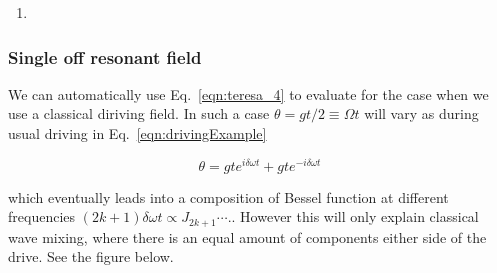 \begin{enumerate}
		\item {}
	\end{enumerate}

	\subsubsection{Single off resonant field}
	 We can automatically use Eq.~\eqref{eqn:teresa_4} to evaluate  for the case when we use a classical diriving field. In such a case $ \theta = gt/2 \equiv \Omega t$ will vary as during usual driving in Eq.~\eqref{eqn:drivingExample}
	 
	 \begin{equation}\label{key}
	 	\theta = gt e^{i\delta\omega t} + gte^{-i\delta\omega t}
	 \end{equation}
	 
	 \noindent which eventually leads into a composition of Bessel function at different frequencies $ (2k+1)\delta\omega t \propto J_{2k+1}\cdots.$. However this will only explain classical wave mixing, where there is an equal amount of components either side of the drive. See the figure below.

